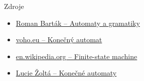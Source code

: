 \documentclass{beamer}
\begin{document}
\begin{frame}{Zdroje}
  \begin{itemize}
  \item\href{https://ktiml.mff.cuni.cz/~bartak/automaty/lectures/lecture01.pdf}{Roman Barták -- Automaty a gramatiky}
  \item\href{http://voho.eu/wiki/konecny-automat/}{voho.eu -- Konečný automat}
  \item\href{https://en.wikipedia.org/wiki/Finite-state_machine}{en.wikipedia.org -- Finite-state machine}
  \item\href{http://lucie.zolta.cz/index.php/statnice-vsb/9-skola-vsb/zaklady-teoreticke-informatiky/4-konecne-automaty}{Lucie Žoltá -- Konečné automaty}
  \end{itemize}
\end{frame}
\end{document}
